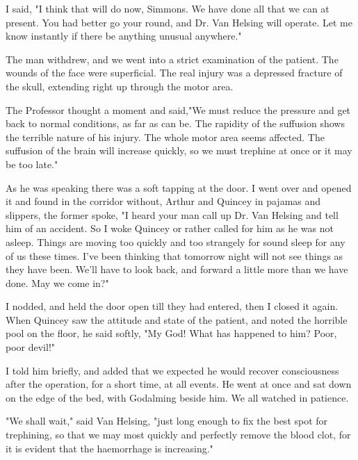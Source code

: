 I said, "I think that will do now, Simmons. We have done all that we can at present. You had better go your round, and Dr. Van Helsing will operate. Let me know instantly if there be anything unusual anywhere." 

The man withdrew, and we went into a strict examination of the patient. The wounds of the face were superficial. The real injury was a depressed fracture of the skull, extending right up through the motor area. 

The Professor thought a moment and said,"We must reduce the pressure and get back to normal conditions, as far as can be. The rapidity of the suffusion shows the terrible nature of his injury. The whole motor area seems affected. The suffusion of the brain will increase quickly, so we must trephine at once or it may be too late." 

As he was speaking there was a soft tapping at the door. I went over and opened it and found in the corridor without, Arthur and Quincey in pajamas and slippers, the former spoke, "I heard your man call up Dr. Van Helsing and tell him of an accident. So I woke Quincey or rather called for him as he was not asleep. Things are moving too quickly and too strangely for sound sleep for any of us these times. I've been thinking that tomorrow night will not see things as they have been. We'll have to look back, and forward a little more than we have done. May we come in?" 

I nodded, and held the door open till they had entered, then I closed it again. When Quincey saw the attitude and state of the patient, and noted the horrible pool on the floor, he said softly, "My God! What has happened to him? Poor, poor devil!" 

I told him briefly, and added that we expected he would recover consciousness after the operation, for a short time, at all events. He went at once and sat down on the edge of the bed, with Godalming beside him. We all watched in patience. 

"We shall wait," said Van Helsing, "just long enough to fix the best spot for trephining, so that we may most quickly and perfectly remove the blood clot, for it is evident that the haemorrhage is increasing." 

